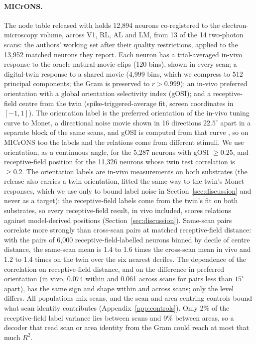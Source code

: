 \documentclass[11pt]{article}
\newcommand{\Rsq}{R^{2}}
\begin{document}
\paragraph{MICrONS.} The node table released with \citet{ding2025} holds 12,894 neurons co-registered to the electron-microscopy volume, across V1, RL, AL and LM, from 13 of the 14 two-photon scans: the authors' working set after their quality restrictions, applied to the 13,952 matched neurons they report. Each neuron has a trial-averaged in-vivo response to the oracle natural-movie clips (120 bins), shown in every scan; a digital-twin response to a shared movie (4,999 bins, which we compress to 512 principal components; the Gram is preserved to $r > 0.999$); an in-vivo preferred orientation with a global orientation selectivity index (gOSI); and a receptive-field centre from the twin (spike-triggered-average fit, screen coordinates in $[-1,1]$). The orientation label is the preferred orientation of the in-vivo tuning curve to Monet, a directional noise movie shown in 16 directions $22.5^\circ$ apart in a separate block of the same scans, and gOSI is computed from that curve \citep{ding2025}, so on MICrONS too the labels and the relations come from different stimuli. We use orientation, as a continuous angle, for the 5,287 neurons with gOSI $\geq 0.25$, and receptive-field position for the 11,326 neurons whose twin test correlation is $\geq 0.2$. The orientation labels are in-vivo measurements on both substrates (the release also carries a twin orientation, fitted the same way to the twin's Monet responses, which we use only to bound label noise in Section~\ref{sec:discussion} and never as a target); the receptive-field labels come from the twin's fit on both substrates, so every receptive-field result, in vivo included, scores relations against model-derived positions (Section~\ref{sec:discussion}). Same-scan pairs correlate more strongly than cross-scan pairs at matched receptive-field distance: with the pairs of 6,000 receptive-field-labelled neurons binned by decile of centre distance, the same-scan mean is 1.4 to 1.6 times the cross-scan mean in vivo and 1.2 to 1.4 times on the twin over the six nearest deciles. The dependence of the correlation on receptive-field distance, and on the difference in preferred orientation (in vivo, 0.074 within and 0.061 across scans for pairs less than $15^\circ$ apart), has the same sign and shape within and across scans; only the level differs. All populations mix scans, and the scan and area centring controls bound what scan identity contributes (Appendix~\ref{app:controls}). Only 2\% of the receptive-field label variance lies between scans and 9\% between areas, so a decoder that read scan or area identity from the Gram could reach at most that much $\Rsq$.
\end{document}
